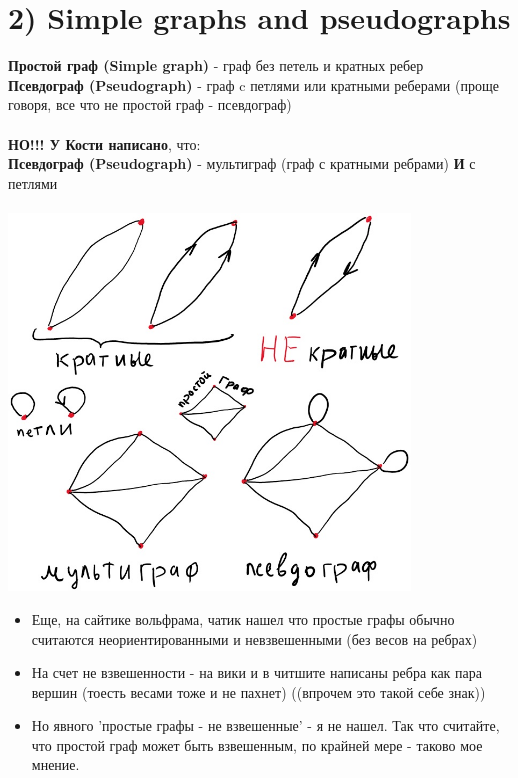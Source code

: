 \documentclass[../TM3-UltraDoc.tex]{subfiles}
\begin{document}
	\section*{2) Simple graphs and pseudographs}
	\textbf{Простой граф (Simple graph)} - граф без петель и кратных ребер\\
	\textbf{Псевдограф (Pseudograph)} - граф c петлями или кратными реберами (проще говоря, все что не простой граф - псевдограф)\\
	\\
	\textbf{НО!!! У Кости написано}, что:\\
	\textbf{Псевдограф (Pseudograph)} - мультиграф (граф с кратными ребрами) \textbf{И} с петлями\\
	\\
	
	\includegraphics[width = 0.8\textwidth]{2.1}
	
	\small
	\begin{tcolorbox}[colframe=gray!50!black, left=5pt, right=5pt, top=5pt, bottom=5pt, boxrule=1pt, colback=gray!10!white]
	\begin {itemize}
		\item Еще, на сайтике вольфрама, чатик нашел что простые графы обычно считаются неориентированными и невзвешенными (без весов на ребрах)
		\item На счет не взвешенности - на вики и в читшите написаны ребра как пара вершин (тоесть весами тоже и не пахнет) ((впрочем это такой себе знак))
		\item Но явного 'простые графы - не взвешенные' - я не нашел. Так что считайте, что простой граф может быть взвешенным, по крайней мере - таково мое мнение.
	\end{itemize}
	\end{tcolorbox}
	\normalsize
		
\end{document}
